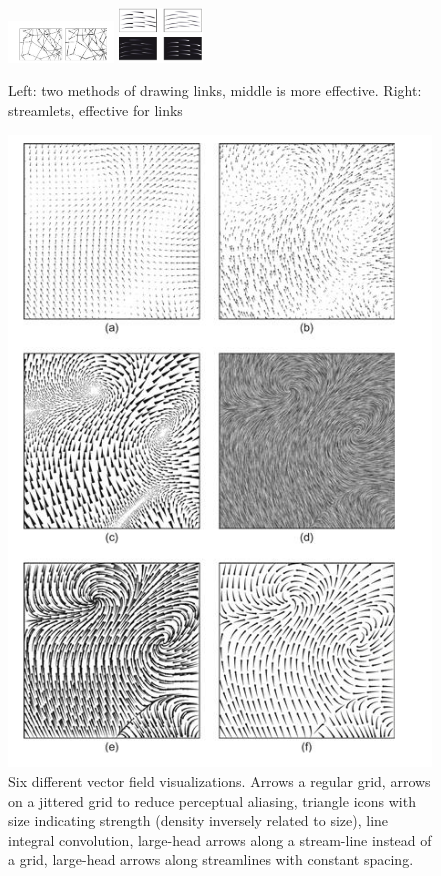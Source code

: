 \begin{mdframed}
\begin{multicols}{2}
\begin{compactdesc}
\end{compactdesc}
    \begin{figure}[H]
        \centering
        \includegraphics[width=0.25\textwidth]{link_vis.png}
        \includegraphics[width=0.2\textwidth]{streamlets.png}
        \caption{Left: two methods of drawing links, middle is more effective.
        Right: streamlets, effective for links}
    \end{figure}
    \begin{figure}[H]
        \centering
        \includegraphics[width=0.6\linewidth]{six_flows.png}
        \caption{Six different vector field visualizations.
        Arrows a regular grid, arrows on a jittered
        grid to reduce perceptual aliasing, triangle icons with size
        indicating strength (density inversely related to size), line
        integral convolution, large-head arrows along a stream-line instead of
        a grid, large-head arrows along streamlines with constant spacing.}
    \end{figure}
\end{multicols}\end{mdframed}


